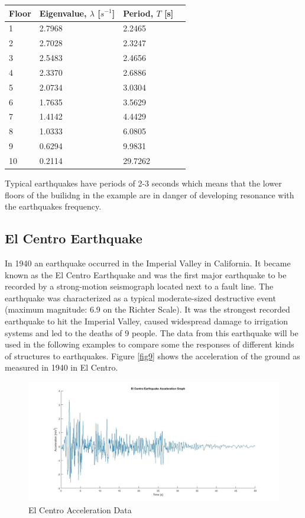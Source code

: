 \documentclass{article}
\begin{document}
				\begin{center}
    					\begin{tabular}{| l | l | l | l |}
    \hline
    Floor & Eigenvalue, $\lambda$ [$s^{-1}$] & Period, $T$ [s] \\ \hline
    1 & 2.7968 & 2.2465 \\ \hline
    2 & 2.7028 & 2.3247 \\ \hline
    3 & 2.5483 & 2.4656 \\ \hline
    4 & 2.3370 & 2.6886 \\ \hline
    5 & 2.0734 & 3.0304 \\ \hline
    6 & 1.7635 & 3.5629 \\ \hline
    7 & 1.4142 & 4.4429 \\ \hline
    8 & 1.0333 & 6.0805 \\ \hline
    9 & 0.6294 & 9.9831 \\ \hline
   10 & 0.2114 & 29.7262 \\ \hline
   					 \end{tabular}
				\end{center}
Typical earthquakes have periods of 2-3 seconds which means that the lower floors of the builidng in the example are in danger of developing resonance with the earthquakes frequency. 

	\subsection{El Centro Earthquake}
In 1940 an earthquake occurred in the Imperial Valley in California. It became known as the El Centro Earthquake and was the first major earthquake to be recorded by a strong-motion seismograph located next to a fault line. The earthquake was characterized as a typical moderate-sized destructive event (maximum magnitude: 6.9 on the Richter Scale). It was the strongest recorded earthquake to hit the Imperial Valley, caused widespread damage to irrigation systems and led to the deaths of 9 people. The data from this earthquake will be used in the following examples to compare some the responses of different kinds of structures to earthquakes. Figure \ref{fig9} shows the acceleration of the ground as measured in 1940 in El Centro. 

				\begin{figure}[h!]
   					 \centering
   					 \includegraphics[width=180mm]{ElCentro.jpg}
   					 \caption{El Centro Acceleration Data}
				            \label{fig10}
  				\end{figure}
\end{document}
